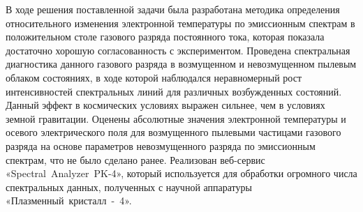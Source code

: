 \Conclusion %

В ходе решения поставленной задачи была разработана методика определения относительного изменения электронной
температуры по эмиссионным спектрам в положительном столе газового разряда постоянного тока, которая показала
достаточно хорошую согласованность с экспериментом. Проведена спектральная диагностика данного газового разряда
в возмущенном и невозмущенном пылевым облаком состояниях, в ходе которой наблюдался неравномерный рост интенсивностей
спектральных линий для различных возбужденных состояний. Данный эффект в космических условиях выражен сильнее, чем
в условиях земной гравитации. Оценены абсолютные значения электронной температуры и осевого электрического поля
для возмущенного пылевыми частицами газового разряда на основе параметров невозмущенного разряда
по эмиссионным спектрам, что не было сделано ранее. Реализован веб-сервис «Spectral~Analyzer~PK-4», который
используется для обработки огромного числа спектральных данных, полученных с научной аппаратуры
«Плазменный~кристалл~-~4».

